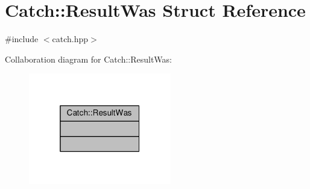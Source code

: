 \hypertarget{struct_catch_1_1_result_was}{\section{Catch\-:\-:Result\-Was Struct Reference}
\label{struct_catch_1_1_result_was}
}


{\ttfamily \#include $<$catch.\-hpp$>$}



Collaboration diagram for Catch\-:\-:Result\-Was\-:
\nopagebreak
\begin{figure}[H]
\begin{center}
\leavevmode
\includegraphics[width=176pt]{struct_catch_1_1_result_was__coll__graph}
\end{center}
\end{figure}

